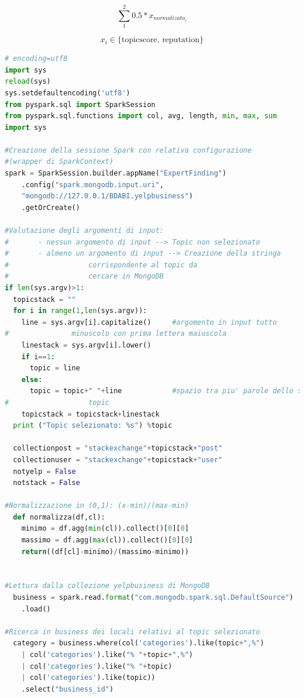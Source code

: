 \begin{equation*}
\sum_{1}^{2}{0.5*x_{{normalizato}_i}}
\end{equation*}

\begin{equation*}
    x_i \in \{\mbox{topicscore, reputation}\}
\end{equation*}

\begin{lstlisting}[language=Python, caption={Expert Finding}, captionpos=b, label={lst:ef}]
# encoding=utf8
import sys
reload(sys)
sys.setdefaultencoding('utf8')
from pyspark.sql import SparkSession
from pyspark.sql.functions import col, avg, length, min, max, sum
import sys

#Creazione della sessione Spark con relativa configurazione 
#(wrapper di SparkContext)
spark = SparkSession.builder.appName("ExpertFinding")
	.config("spark.mongodb.input.uri", 
	"mongodb://127.0.0.1/BDABI.yelpbusiness")
	.getOrCreate()

#Valutazione degli argomenti di input:
#       - nessun argomento di input --> Topic non selezionato
#       - almeno un argomento di input --> Creazione della stringa 
#					corrispondente al topic da 
#					cercare in MongoDB
if len(sys.argv)>1:
  topicstack = ""
  for i in range(1,len(sys.argv)):
    line = sys.argv[i].capitalize()     #argomento in input tutto 
#				minuscolo con prima lettera maiuscola
    linestack = sys.argv[i].lower()
    if i==1:
      topic = line
    else:
      topic = topic+" "+line            #spazio tra piu' parole dello stesso 
#					topic
    topicstack = topicstack+linestack
  print ("Topic selezionato: %s") %topic

  collectionpost = "stackexchange"+topicstack+"post"
  collectionuser = "stackexchange"+topicstack+"user"
  notyelp = False
  notstack = False

#Normalizzazione in (0,1): (x-min)/(max-min)
  def normalizza(df,cl):
    minimo = df.agg(min(cl)).collect()[0][0]
    massimo = df.agg(max(cl)).collect()[0][0]
    return((df[cl]-minimo)/(massimo-minimo))


#Lettura dalla collezione yelpbusiness di MongoDB
  business = spark.read.format("com.mongodb.spark.sql.DefaultSource")
	.load()

#Ricerca in business dei locali relativi al topic selezionato
  category = business.where(col('categories').like(topic+",%") 
	| col('categories').like("% "+topic+",%") 
	| col('categories').like("% "+topic) 
	| col('categories').like(topic))
	.select("business_id")


\end{lstlisting}
